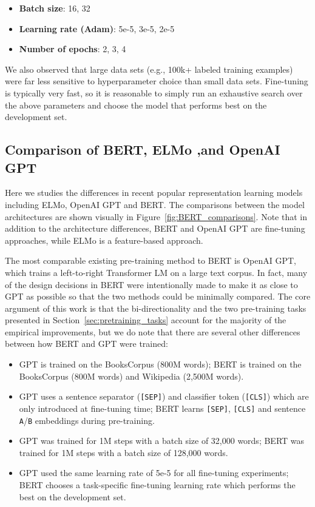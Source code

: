 \documentclass[11pt,a4paper]{article}
\begin{document}
\begin{itemize}[noitemsep]
\item {\bf Batch size}: 16, 32
\item {\bf Learning rate (Adam)}: 5e-5, 3e-5, 2e-5
\item {\bf Number of epochs}: 2, 3, 4
\end{itemize}

We also observed that large data sets (e.g., 100k+ labeled training examples) were far less sensitive to hyperparameter choice than small data sets. Fine-tuning is typically very fast, so it is reasonable to simply run an exhaustive search over the above parameters and choose the model that performs best on the development set.

\subsection{Comparison of BERT, ELMo ,and OpenAI GPT}
\label{appendix:sec:comparing_bert_and_openai}

Here we studies the differences in recent popular representation learning
models including ELMo, OpenAI GPT and BERT.
The comparisons between the model
architectures are shown visually in Figure~\ref{fig:BERT_comparisons}. Note that
in addition to the architecture differences, BERT and OpenAI GPT are fine-tuning approaches, while ELMo is a feature-based approach.

The most comparable existing pre-training method to BERT is OpenAI GPT, which trains a left-to-right Transformer LM on a large text corpus. 
In fact, many of the design decisions in BERT were intentionally made to make it as close to GPT as possible so that the two methods could be minimally compared.
The core argument of this work is that the bi-directionality and the two pre-training tasks presented in Section~\ref{sec:pretraining_tasks} account for the majority of the empirical improvements, but we do note that there are several other differences between how BERT and GPT were trained:

\begin{itemize}
\item GPT is trained on the BooksCorpus (800M words); BERT is trained on the BooksCorpus (800M words) and Wikipedia (2,500M words).
\item GPT uses a sentence separator ({\tt [SEP]}) and classifier token ({\tt [CLS]}) which are only introduced at fine-tuning time; BERT learns {\tt [SEP]}, {\tt [CLS]} and sentence {\tt A}/{\tt B} embeddings during pre-training.
\item GPT was trained for 1M steps with a batch size of 32,000 words; BERT was trained for 1M steps with a batch size of 128,000 words.
\item GPT used the same learning rate of 5e-5 for all fine-tuning experiments; BERT chooses a task-specific fine-tuning learning rate which performs the best on the development set.
\end{itemize}
\end{document}
